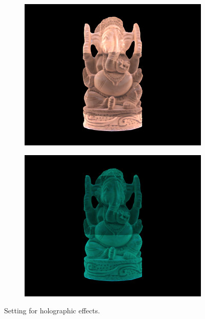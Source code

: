 \documentclass[conference]{IEEEtran}
\begin{document}
\begin{figure}[h]
\begin{center}
\begin{subfigure}[t]{0.11\textwidth}
					\caption{\label{fig:ilusi2}}
				\end{subfigure}
				\hspace{0.05em}
				\begin{subfigure}[t]{0.11\textwidth}
					\includegraphics[width=\textwidth]{img/ilusi3.png}
					\caption{\label{fig:ilusi3}}
				\end{subfigure}
				\hspace{0.05em}
				\begin{subfigure}[t]{0.11\textwidth}
					\includegraphics[width=\textwidth]{img/ilusi4.png}
					\caption{\label{fig:ilusi4}}
				\end{subfigure}
			\end{center}
			\vspace{-1ex}
			\caption{Setting for holographic effects.}
			\label{fig:sb_p1}
		\end{figure}
		\vspace{-2ex}
		
\end{document}

